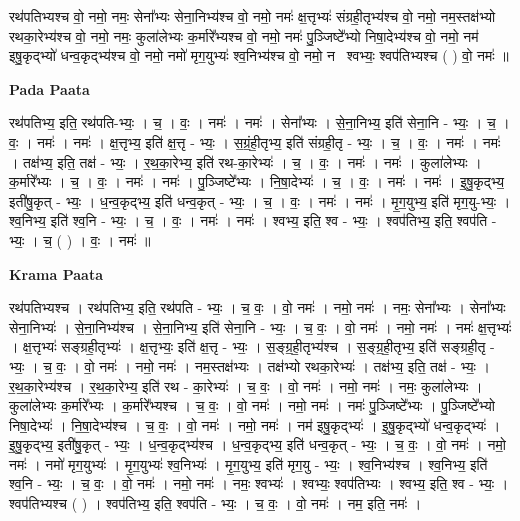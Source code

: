 \documentclass[17pt]{extarticle}
\begin{document}
रथ॑पतिभ्यश्च वो॒ नमो॒                                                      नमः॒ सेना᳚भ्यः सेना॒निभ्य॑श्च वो॒ नमो॒                                               नमः॑ क्ष॒त्तृभ्यः॑ संग्रही॒तृभ्य॑श्च वो॒ नमो॒                                     नम॒स्तक्ष॑भ्यो रथका॒रेभ्य॑श्च वो॒ नमो॒                                                    नमः॒ कुला॑लेभ्यः क॒र्मारे᳚भ्यश्च वो॒ नमो॒                                            नमः॑ पु॒ञ्जिष्टे᳚भ्यो निषा॒देभ्य॑श्च वो॒ नमो॒                                                नम॑ इषु॒कृद्भ्यो॑ धन्व॒कृद्भ्य॑श्च वो॒ नमो॒                                                नमो॑ मृग॒युभ्यः॑ श्व॒निभ्य॑श्च वो॒ नमो॒                                                     नमः᳡श्वभ्यः॒ श्वप॑तिभ्यश्च ( ) वो॒ नमः॑ ॥ \newline

\textbf{Pada Paata} \newline

रथ॑पतिभ्य॒ इति॒ रथ॑पति-भ्यः॒ । च॒ । वः॒ । नमः॑ । नमः॑ । सेना᳚भ्यः । से॒ना॒निभ्य॒ इति॑ सेना॒नि - भ्यः॒ । च॒ । वः॒ । नमः॑ । नमः॑ । क्ष॒त्तृभ्य॒ इति॑ क्ष॒त्तृ - भ्यः॒ । स॒ग्रं॒ही॒तृभ्य॒ इति॑ संग्रही॒तृ - भ्यः॒ । च॒ । वः॒ । नमः॑ । नमः॑ । तक्ष॑भ्य॒ इति॒ तक्ष॑ - भ्यः॒ । र॒थ॒का॒रेभ्य॒ इति॑ रथ-का॒रेभ्यः॑ । च॒ । वः॒ । नमः॑ । नमः॑ । कुला॑लेभ्यः । क॒र्मारे᳚भ्यः । च॒ । वः॒ । नमः॑ । नमः॑ । पु॒ञ्जिष्टे᳚भ्यः । नि॒षा॒देभ्यः॑ । च॒ । वः॒ । नमः॑ । नमः॑ । इ॒षु॒कृद्भ्य॒ इती॑षु॒कृत् - भ्यः॒ । ध॒न्व॒कृद्भ्य॒ इति॑ धन्व॒कृत् - भ्यः॒ । च॒ । वः॒ । नमः॑ । नमः॑ । मृ॒ग॒युभ्य॒ इति॑ मृग॒यु-भ्यः॒ । श्व॒निभ्य॒ इति॑ श्व॒नि - भ्यः॒ । च॒ । वः॒ । नमः॑ । नमः॑ । श्वभ्य॒ इति॒ श्व - भ्यः॒ । श्वप॑तिभ्य॒ इति॒ श्वप॑ति - भ्यः॒ । च॒ ( ) । वः॒ । नमः॑ ॥  \newline


\textbf{Krama Paata} \newline

रथ॑पतिभ्यश्च । रथ॑पतिभ्य॒ इति॒ रथ॑पति - भ्यः॒ । च॒ वः॒ । वो॒ नमः॑ । नमो॒ नमः॑ । नमः॒ सेना᳚भ्यः । सेना᳚भ्यः सेना॒निभ्यः॑ । से॒ना॒निभ्य॑श्च । से॒ना॒निभ्य॒ इति॑ सेना॒नि - भ्यः॒ । च॒ वः॒ । वो॒ नमः॑ । नमो॒ नमः॑ । नमः॑ क्ष॒त्तृभ्यः॑ । क्ष॒त्तृभ्यः॑ सङ्ग्रही॒तृभ्यः॑ । क्ष॒त्तृभ्यः॒ इति॑ क्ष॒त्तृ - भ्यः॒ । स॒ङ्ग्र॒ही॒तृभ्य॑श्च । स॒ङ्ग्र॒ही॒तृभ्य॒ इति॑ सङ्ग्रही॒तृ - भ्यः॒ । च॒ वः॒ । वो॒ नमः॑ । नमो॒ नमः॑ । नम॒स्तक्ष॑भ्यः । तक्ष॑भ्यो रथका॒रेभ्यः॑ । तक्ष॑भ्य॒ इति॒ तक्ष॑ - भ्यः॒ । र॒थ॒का॒रेभ्य॑श्च । र॒थ॒का॒रेभ्य॒ इति॑ रथ - का॒रेभ्यः॑ । च॒ वः॒ । वो॒ नमः॑ । नमो॒ नमः॑ । नमः॒ कुला॑लेभ्यः । कुला॑लेभ्यः क॒र्मारे᳚भ्यः । क॒र्मारे᳚भ्यश्च । च॒ वः॒ । वो॒ नमः॑ । नमो॒ नमः॑ । नमः॑ पु॒ञ्जिष्टे᳚भ्यः । पु॒ञ्जिष्टे᳚भ्यो निषा॒देभ्यः॑ । नि॒षा॒देभ्य॑श्च । च॒ वः॒ । वो॒ नमः॑ । नमो॒ नमः॑ । नम॑ इषु॒कृद्भ्यः॑ । इ॒षु॒कृद्भ्यो॑ धन्व॒कृद्भ्यः॑ । इ॒षु॒कृद्भ्य॒ इती॑षु॒कृत् - भ्यः॒ । ध॒न्व॒कृद्भ्य॑श्च । ध॒न्व॒कृद्भ्य॒ इति॑ धन्व॒कृत् - भ्यः॒ । च॒ वः॒ । वो॒ नमः॑ । नमो॒ नमः॑ । नमो॑ मृग॒युभ्यः॑ । मृ॒ग॒युभ्यः॑ श्व॒निभ्यः॑ । मृ॒ग॒युभ्य॒ इति॑ मृग॒यु - भ्यः॒ । श्व॒निभ्य॑श्च । श्व॒निभ्य॒ इति॑ श्व॒नि - भ्यः॒ । च॒ वः॒ । वो॒ नमः॑ । नमो॒ नमः॑ । नमः॒ श्वभ्यः॑ । श्वभ्यः॒ श्वप॑तिभ्यः । श्वभ्य॒ इति॒ श्व - भ्यः॒ । श्वप॑तिभ्यश्च ( ) । श्वप॑तिभ्य॒ इति॒ श्वप॑ति - भ्यः॒ । च॒ वः॒ । वो॒ नमः॑ । नम॒ इति॒ नमः॑ । \newline
\end{document}
